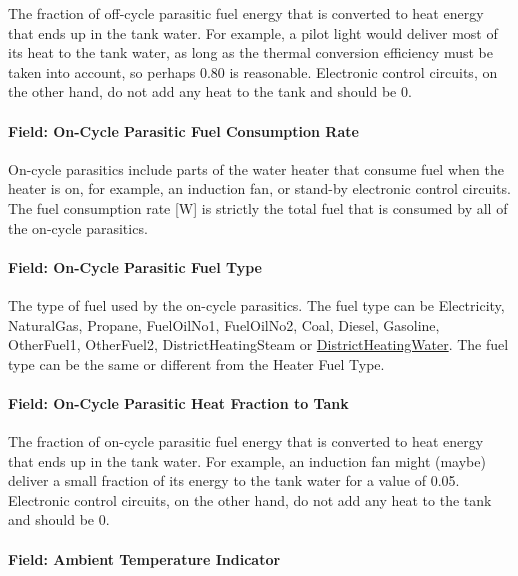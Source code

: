 The fraction of off-cycle parasitic fuel energy that is converted to heat energy that ends up in the tank water. For example, a pilot light would deliver most of its heat to the tank water, as long as the thermal conversion efficiency must be taken into account, so perhaps 0.80 is reasonable. Electronic control circuits, on the other hand, do not add any heat to the tank and should be 0.

\paragraph{Field: On-Cycle Parasitic Fuel Consumption Rate}\label{field-on-cycle-parasitic-fuel-consumption-rate}

On-cycle parasitics include parts of the water heater that consume fuel when the heater is on, for example, an induction fan, or stand-by electronic control circuits. The fuel consumption rate {[}W{]} is strictly the total fuel that is consumed by all of the on-cycle parasitics.

\paragraph{Field: On-Cycle Parasitic Fuel Type}\label{field-on-cycle-parasitic-fuel-type}

The type of fuel used by the on-cycle parasitics. The fuel type can be Electricity, NaturalGas, Propane, FuelOilNo1, FuelOilNo2, Coal, Diesel, Gasoline, OtherFuel1, OtherFuel2, DistrictHeatingSteam or \hyperref[districtheating]{DistrictHeatingWater}. The fuel type can be the same or different from the Heater Fuel Type.

\paragraph{Field: On-Cycle Parasitic Heat Fraction to Tank}\label{field-on-cycle-parasitic-heat-fraction-to-tank}

The fraction of on-cycle parasitic fuel energy that is converted to heat energy that ends up in the tank water. For example, an induction fan might (maybe) deliver a small fraction of its energy to the tank water for a value of 0.05. Electronic control circuits, on the other hand, do not add any heat to the tank and should be 0.

\paragraph{Field: Ambient Temperature Indicator}\label{field-ambient-temperature-indicator-000}

